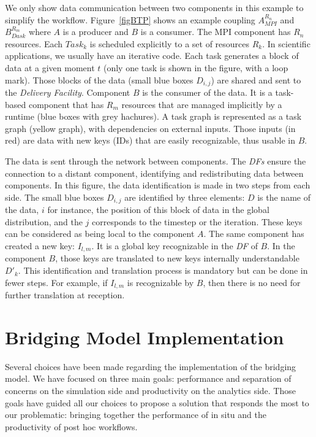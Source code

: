 We only show data communication between two \deisa components in this example to simplify the workflow.
Figure~\ref{figBTP} shows an example coupling $A_{MPI}^{R_{n}}$ and $B_{Dask}^{R_{m}}$ where $A$ is a producer and $B$ is a consumer. The MPI component has $R_{n}$ resources. Each $Task_k$ is scheduled explicitly to a set of resources $R_{k}$. In scientific applications, we usually have an iterative code. Each task generates a block of data at a given moment $t$ (only one task is shown in the figure, with a loop mark). Those blocks of the data (small blue boxes $D_{i,j}$) are shared and sent to the \textit{Delivery Facility}.
Component $B$ is the consumer of the data. It is a task-based component that has $R_{m}$ resources that are managed implicitly by a runtime (blue boxes with grey hachures). A task graph is represented as a \deisa task graph (yellow graph), with dependencies on external inputs. Those inputs (in red) are data with new keys (IDs) that are easily recognizable, thus usable in $B$.  

The data is sent through the network between components. The \textit{DFs} ensure the connection to a distant component, identifying and redistributing data between components. 
In this figure, the data identification is made in two steps from each side. The small blue boxes $D_{i,j}$ are identified by three elements: $D$ is the name of the data, $i$ for instance, the position of this block of data in the global distribution, and the $j$ corresponds to the timestep or the iteration. These keys can be considered as being local to the component $A$. 
The same component has created a new key: $I_{l,m}$. It is a global key recognizable in the \textit{DF} of $B$. In the component $B$, those keys are translated to new keys internally understandable $D'_{k}$. 
This identification and translation process is mandatory but can be done in fewer steps. For example, if $I_{l,m}$ is recognizable by $B$, then there is no need for further translation at reception.


\section{\deisa Bridging Model Implementation}\label{sec:btpimplementation}

Several choices have been made regarding the implementation of the bridging model. We have focused on three main goals: performance and separation of concerns on the simulation side and productivity on the analytics side. Those goals have guided all our choices to propose a solution that responds the most to our problematic: bringing together the performance of in situ and the productivity of post hoc workflows.

